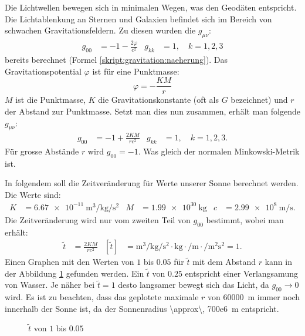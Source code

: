 \begin{refsection}
Die Lichtwellen bewegen sich in minimalen Wegen, was den Geodäten
entspricht.  Die Lichtablenkung an Sternen und Galaxien befindet sich
im Bereich von schwachen Gravitationsfeldern.  Zu diesen wurden die
\(g_{\mu\nu}\):
\begin{align*}
  g_{00} &= -1 -\frac{2\varphi}{c^2} &g_{kk} &= 1,\quad k=1,2,3
\end{align*}
bereits berechnet (Formel \ref{skript:gravitation:naeherung}).
Das Gravitationspotential \(\varphi\) ist für eine Punktmasse:
\begin{equation*}
  \varphi = -\frac{KM}{r}
\end{equation*}
\(M\) ist die Punktmasse, \(K\) die Gravitationskonstante
(oft als \(G\) bezeichnet) und \(r\) der Abstand zur Punktmasse.
Setzt man dies nun zusammen, erhält man folgende \(g_{\mu\nu}\):
\begin{align*}
  g_{00} &= -1 +\frac{2KM}{rc^2} &g_{kk} &= 1,\quad k=1,2,3.
\end{align*}
Für grosse Abstände \(r\) wird \(g_{00}=-1\).  Was gleich der normalen
Minkowski-Metrik ist.

\begin{beispiel}
  In folgendem soll die Zeitveränderung für Werte unserer Sonne
  berechnet werden.  Die Werte sind:
  \begin{align*}
    K &= \SI{6.67e-11}{\meter\cubed\per\kilogram\per\second\squared}
    &M &= \SI{1.99e30}{\kilogram}
    &c &= \SI{2.99e8}{\meter\per\second}.
  \end{align*}
  Die Zeitveränderung wird nur vom zweiten Teil von \(g_{00}\)
  bestimmt, wobei man erhält:
  \begin{align*}
    \tilde{t} &= \frac{2KM}{rc^2}
    &\left[\tilde{t}\right] &=
                              \si{\meter\cubed\per\kilogram\per\second\squared}
                              \cdot \si{\kilogram}
                              \cdot \si{\per\meter}
                              \cdot \si{\per\meter\squared\second\squared}
                              = 1.
  \end{align*}
  Einen Graphen mit den Werten von \(1\) bis \(0.05\) für
  \(\tilde{t}\) mit dem Abstand \(r\) kann in der Abbildung
  \ref{fig:bsp1} gefunden werden.  Ein \(\tilde{t}\) von \(0.25\)
  entspricht einer Verlangsamung von Wasser.  Je näher bei
  \(\tilde{t}=1\) desto langsamer bewegt sich das Licht, da
  \(g_{00} \rightarrow 0\) wird.  Es ist zu beachten, dass das
  geplotete maximale \(r\) von \SI{60000}{\meter} immer noch innerhalb
  der Sonne ist, da der Sonnenradius \SI{\approx\, 700e6}{\meter}
  entspricht.
  \begin{figure}
    \centering
    
    \caption{\(\tilde{t}\) von \(1\) bis \(0.05\)}
    \label{fig:bsp1}
  \end{figure}
\end{beispiel}


\end{refsection}
